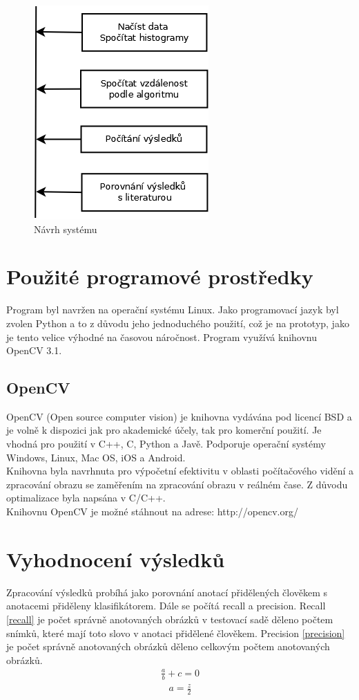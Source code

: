 \documentclass[czech,BP]{thesiskiv}
\begin{document}
\begin{figure}[h]
		\centering
		\includegraphics[width=253px]{./img/graf.png}	
		\caption{Návrh systému}
\end{figure}


\chapter{Použité programové prostředky}
Program byl navržen na operační systému Linux. Jako programovací jazyk byl zvolen Python a to z důvodu jeho jednoduchého použití, což je na prototyp, jako je tento velice výhodné na časovou náročnost. Program využívá knihovnu OpenCV 3.1. 
  
\section{OpenCV}
OpenCV (Open source computer vision) je knihovna vydávána pod licencí BSD a je volně k dispozici jak pro akademické účely, tak pro komerční použití. Je vhodná pro použití v C++, C, Python a Javě. Podporuje operační systémy Windows, Linux, Mac OS, iOS a Android.
\\
Knihovna byla navrhnuta pro výpočetní efektivitu v oblasti počítačového vidění a zpracování obrazu se zaměřením na zpracování obrazu v reálném čase. Z důvodu optimalizace byla napsána v C/C++. 
\\
Knihovnu OpenCV je možné stáhnout na adrese: http://opencv.org/
\\

\chapter{Vyhodnocení výsledků}
Zpracování výsledků probíhá jako porovnání anotací přidělených člověkem s anotacemi přiděleny klasifikátorem. Dále se počítá recall a precision. Recall \eqref{recall} je počet správně anotovaných obrázků v testovací sadě děleno počtem snímků, které mají toto slovo v anotaci přidělené člověkem. Precision \eqref{precision} je počet správně anotovaných obrázků děleno celkovým počtem anotovaných obrázků. 
\begin{align}
   \label{recall} \frac{a}{b} + c = 0
\end{align}
\begin{align}
   \label{precision} a = \frac{z}{2}
\end{align}
\end{document}
